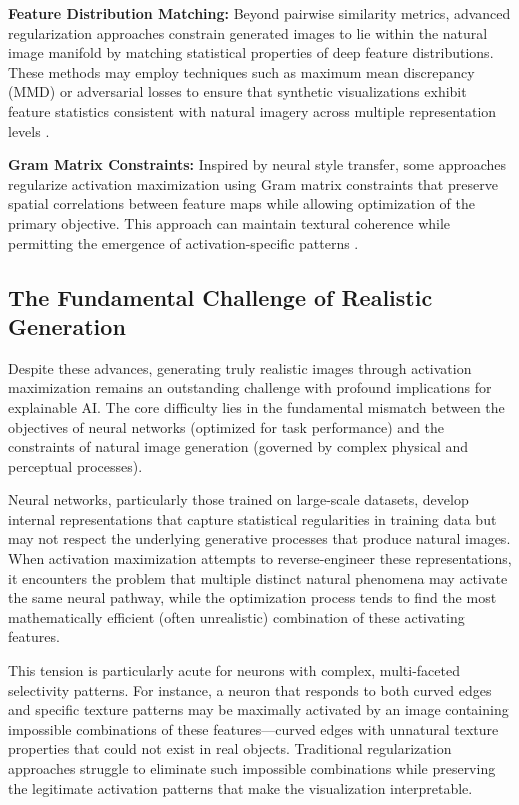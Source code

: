\documentclass[licencjacka,en]{pracamgr}
\begin{document}
\textbf{Feature Distribution Matching:} Beyond pairwise similarity metrics, advanced regularization approaches constrain generated images to lie within the natural image manifold by matching statistical properties of deep feature distributions. These methods may employ techniques such as maximum mean discrepancy (MMD) or adversarial losses to ensure that synthetic visualizations exhibit feature statistics consistent with natural imagery across multiple representation levels \citep{goodfellow2014generative, dziugaite2015traininggenerativeneuralnetworks}.

\textbf{Gram Matrix Constraints:} Inspired by neural style transfer, some approaches regularize activation maximization using Gram matrix constraints that preserve spatial correlations between feature maps while allowing optimization of the primary objective. This approach can maintain textural coherence while permitting the emergence of activation-specific patterns \citep{gatys2016image}.

\subsection{The Fundamental Challenge of Realistic Generation}

Despite these advances, generating truly realistic images through activation maximization remains an outstanding challenge with profound implications for explainable AI. The core difficulty lies in the fundamental mismatch between the objectives of neural networks (optimized for task performance) and the constraints of natural image generation (governed by complex physical and perceptual processes).

Neural networks, particularly those trained on large-scale datasets, develop internal representations that capture statistical regularities in training data but may not respect the underlying generative processes that produce natural images. When activation maximization attempts to reverse-engineer these representations, it encounters the problem that multiple distinct natural phenomena may activate the same neural pathway, while the optimization process tends to find the most mathematically efficient (often unrealistic) combination of these activating features.

This tension is particularly acute for neurons with complex, multi-faceted selectivity patterns. For instance, a neuron that responds to both curved edges and specific texture patterns may be maximally activated by an image containing impossible combinations of these features—curved edges with unnatural texture properties that could not exist in real objects. Traditional regularization approaches struggle to eliminate such impossible combinations while preserving the legitimate activation patterns that make the visualization interpretable.
\end{document}
